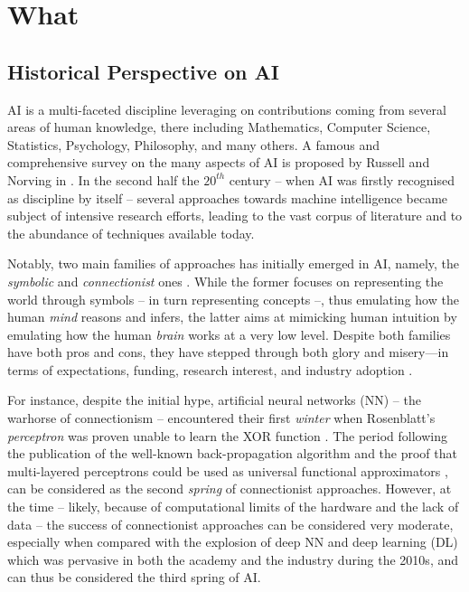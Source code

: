 \documentclass[12pt,a4paper,openright,twoside]{book}
\begin{document}



\part{What}
\label{part:what}

\chapter{Historical Perspective on AI}

AI is a multi-faceted discipline leveraging on contributions coming from several areas of human knowledge, there including Mathematics, Computer Science, Statistics, Psychology, Philosophy, and many others.
%
A famous and comprehensive survey on the many aspects of AI is proposed by Russell and Norving in \cite{russell2016artificial}.
%
In the second half the $20^{th}$ century -- when AI was firstly recognised as discipline by itself -- several approaches towards machine intelligence became subject of intensive research efforts, leading to the vast corpus of literature and to the abundance of techniques available today.

Notably, two main families of approaches has initially emerged in AI, namely, the \emph{symbolic} and \emph{connectionist} ones \cite{Smolensky1987, SUN2001783}.
%
While the former focuses on representing the world through symbols -- in turn representing concepts --, thus emulating how the human \emph{mind} reasons and infers, the latter aims at mimicking human intuition by emulating how the human \emph{brain} works at a very low level.
%
Despite both families have both pros and cons, they have stepped through both glory and misery---in terms of expectations, funding, research interest, and industry adoption \cite{Hendler2008, russell2016artificial}.

For instance, despite the initial hype, artificial neural networks (NN) -- the warhorse of connectionism -- encountered their first \emph{winter} when Rosenblatt's \emph{perceptron} \cite{rosenblatt1957perceptron} was proven unable to learn the XOR function \cite{Minsky1988}.
%
The period following the publication of the well-known back-propagation algorithm \cite{Rumelhart1986} and the proof that multi-layered perceptrons could be used as universal functional approximators \cite{Cybenko1989}, can be considered as the second \emph{spring} of connectionist approaches.
%
However, at the time -- likely, because of computational limits of the hardware and the lack of data -- the success of connectionist approaches can be considered very moderate, especially when compared with the explosion of deep NN and deep learning (DL) \cite{GoodfellowBC2016} which was pervasive in both the academy and the industry during the 2010s, and can thus be considered the third spring of AI.
\end{document}
